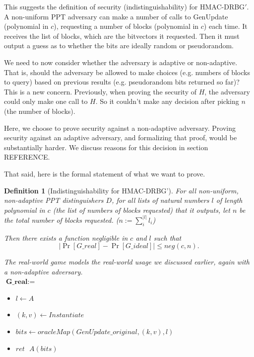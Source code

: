 \documentclass[12pt,lot, lof]{puthesis}
\newenvironment{game}
{ \begin{itemize}[noitemsep,nolistsep] 
}
{ \end{itemize}                  }
\newcommand{\s} {\textrm{ }}
\newcommand{\lar}{\leftarrow}
\newtheorem{dfn}[thm]{Definition}
\begin{document}
{This suggests the definition of security (indistinguishability) for HMAC-DRBG$'$. A non-uniform PPT adversary can make a number of calls to GenUpdate (polynomial in $c$), requesting a number of blocks (polynomial in $c$) each time. It receives the list of blocks, which are the bitvectors it requested. Then it must output a guess as to whether the bits are ideally random or pseudorandom.

We need to now consider whether the adversary is adaptive or non-adaptive. That is, should the adversary be allowed to make choices (e.g. numbers of blocks to query) based on previous results (e.g. pseudorandom bits returned so far)? This is a new concern. Previously, when proving the security of $H$, the adversary could only make one call to $H$. So it couldn't make any decision after picking $n$ (the number of blocks). 

Here, we choose to prove security against a non-adaptive adversary. Proving security against an adaptive adversary, and formalizing that proof, would be substantially harder. We discuss reasons for this decision in section REFERENCE.

That said, here is the formal statement of what we want to prove.

\begin{dfn}[Indistinguishability for HMAC-DRBG'] \label{def:indist}
For all non-uniform, non-adaptive PPT distinguishers $D$, for all lists of natural numbers $l$ of length polynomial in $c$ (the list of numbers of blocks requested) that it outputs, let $n$ be the total number of blocks requested. ($n := \sum_i^{|l|} l_i$) 

Then there exists a function negligible in $c$ and $l$ such that
$$|\Pr[G\_real] - \Pr[G\_ideal]| \leq neg(c, n).$$

The real-world game models the real-world usage we discussed earlier, again with a non-adaptive adversary.\\

$\textbf{G\_real} := $
\begin{game}
\item[] $l \leftarrow A$
\item[] $(k,v) \leftarrow Instantiate$
\item[] $bits \lar oracleMap(GenUpdate\_original,(k, v),l)$
\item[] $ret \s A(bits)$ \\
\end{game}


\end{dfn}}
\end{document}
